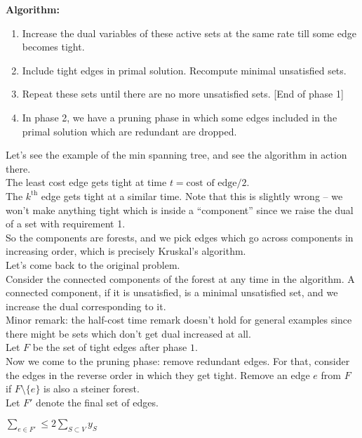\documentclass[a4paper]{article}
\newcommand{\nl}{\vspace{0.2cm}\\}
\begin{document}
\textbf{Algorithm:}
\begin{enumerate}
    \item Increase the dual variables of these active sets at the same rate till some edge becomes tight.
    \item Include tight edges in primal solution. Recompute minimal unsatisfied sets.
    \item Repeat these sets until there are no more unsatisfied sets. [End of phase 1]
    \item In phase 2, we have a pruning phase in which some edges included in the primal solution which are redundant are dropped.
\end{enumerate}
Let's see the example of the min spanning tree, and see the algorithm in action there.\nl
The least cost edge gets tight at time $t = \text{cost of edge}/2$.\nl
The $k^\mathrm{th}$ edge gets tight at a similar time. Note that this is slightly wrong -- we won't make anything tight which is inside a ``component'' since we raise the dual of a set with
requirement 1.\nl
So the components are forests, and we pick edges which go across components in increasing order, which is precisely Kruskal's algorithm.\nl
Let's come back to the original problem.\nl
Consider the connected components of the forest at any time in the algorithm. A connected component, if it is unsatisfied, is a minimal unsatisfied set, and we increase the dual
corresponding to it.\nl
Minor remark: the half-cost time remark doesn't hold for general examples since there might be sets which don't get dual increased at all.\nl
Let $F$ be the set of tight edges after phase $1$.\nl
Now we come to the pruning phase: remove redundant edges. For that, consider the edges in the reverse order in which they get tight. Remove an edge $e$ from $F$ if $F \setminus \{e\}$ is also a
steiner forest.\nl
Let $F'$ denote the final set of edges.\nl
\begin{claim}
    $\sum_{e \in F'} \le 2 \sum_{S \subset V} y_S$
\end{claim}
\end{document}
